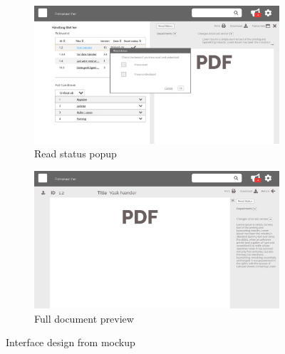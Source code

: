 \begin{figure}[H]\ContinuedFloat
	\centering
	\begin{subfigure}[b]{0.48\textwidth}
		\includegraphics[width=\textwidth]{billeder/iteration2Prototyper/Page_5.jpg}
		\caption{Read status popup}
		\label{fig:4-Read}
	\end{subfigure}
	\quad
	\begin{subfigure}[b]{0.48\textwidth}
		\includegraphics[width=\textwidth]{billeder/iteration2Prototyper/Page_6.jpg}
		\caption{Full document preview}
		\label{fig:4-DocPrevieFull}
	\end{subfigure}
	\caption{Interface design from mockup}\label{fig:4-MockUp}
\end{figure}

\newpage
